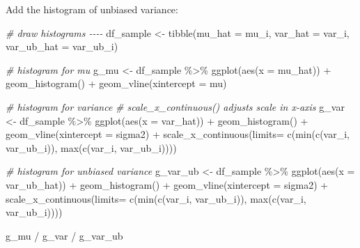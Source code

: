 \documentclass[
]{book}
\newenvironment{Shaded}{\begin{snugshade}}{\end{snugshade}}
\newcommand{\AttributeTok}[1]{\textcolor[rgb]{0.77,0.63,0.00}{#1}}
\newcommand{\CommentTok}[1]{\textcolor[rgb]{0.56,0.35,0.01}{\textit{#1}}}
\newcommand{\FunctionTok}[1]{\textcolor[rgb]{0.00,0.00,0.00}{#1}}
\newcommand{\NormalTok}[1]{#1}
\newcommand{\OtherTok}[1]{\textcolor[rgb]{0.56,0.35,0.01}{#1}}
\newcommand{\SpecialCharTok}[1]{\textcolor[rgb]{0.00,0.00,0.00}{#1}}
\begin{document}
Add the histogram of unbiased variance:

\begin{Shaded}
\begin{Highlighting}[]
\CommentTok{\# draw histograms {-}{-}{-}{-}}
\NormalTok{df\_sample }\OtherTok{\textless{}{-}} \FunctionTok{tibble}\NormalTok{(}\AttributeTok{mu\_hat =}\NormalTok{ mu\_i,}
                    \AttributeTok{var\_hat =}\NormalTok{ var\_i,}
                    \AttributeTok{var\_ub\_hat =}\NormalTok{ var\_ub\_i)}

\CommentTok{\# histogram for mu}
\NormalTok{g\_mu }\OtherTok{\textless{}{-}}\NormalTok{ df\_sample }\SpecialCharTok{\%\textgreater{}\%} 
  \FunctionTok{ggplot}\NormalTok{(}\FunctionTok{aes}\NormalTok{(}\AttributeTok{x =}\NormalTok{ mu\_hat)) }\SpecialCharTok{+}
  \FunctionTok{geom\_histogram}\NormalTok{() }\SpecialCharTok{+}
  \FunctionTok{geom\_vline}\NormalTok{(}\AttributeTok{xintercept =}\NormalTok{ mu)}

\CommentTok{\# histogram for variance}
\CommentTok{\# scale\_x\_continuous() adjusts scale in x{-}axis}
\NormalTok{g\_var }\OtherTok{\textless{}{-}}\NormalTok{ df\_sample }\SpecialCharTok{\%\textgreater{}\%} 
  \FunctionTok{ggplot}\NormalTok{(}\FunctionTok{aes}\NormalTok{(}\AttributeTok{x =}\NormalTok{ var\_hat)) }\SpecialCharTok{+}
  \FunctionTok{geom\_histogram}\NormalTok{() }\SpecialCharTok{+}
  \FunctionTok{geom\_vline}\NormalTok{(}\AttributeTok{xintercept =}\NormalTok{ sigma2) }\SpecialCharTok{+}
  \FunctionTok{scale\_x\_continuous}\NormalTok{(}\AttributeTok{limits=} \FunctionTok{c}\NormalTok{(}\FunctionTok{min}\NormalTok{(}\FunctionTok{c}\NormalTok{(var\_i, var\_ub\_i)),}
                               \FunctionTok{max}\NormalTok{(}\FunctionTok{c}\NormalTok{(var\_i, var\_ub\_i))))}

\CommentTok{\# histogram for unbiased variance}
\NormalTok{g\_var\_ub }\OtherTok{\textless{}{-}}\NormalTok{ df\_sample }\SpecialCharTok{\%\textgreater{}\%} 
  \FunctionTok{ggplot}\NormalTok{(}\FunctionTok{aes}\NormalTok{(}\AttributeTok{x =}\NormalTok{ var\_ub\_hat)) }\SpecialCharTok{+}
  \FunctionTok{geom\_histogram}\NormalTok{() }\SpecialCharTok{+}
  \FunctionTok{geom\_vline}\NormalTok{(}\AttributeTok{xintercept =}\NormalTok{ sigma2) }\SpecialCharTok{+}
  \FunctionTok{scale\_x\_continuous}\NormalTok{(}\AttributeTok{limits=} \FunctionTok{c}\NormalTok{(}\FunctionTok{min}\NormalTok{(}\FunctionTok{c}\NormalTok{(var\_i, var\_ub\_i)),}
                               \FunctionTok{max}\NormalTok{(}\FunctionTok{c}\NormalTok{(var\_i, var\_ub\_i))))}

\NormalTok{g\_mu }\SpecialCharTok{/}\NormalTok{ g\_var }\SpecialCharTok{/}\NormalTok{ g\_var\_ub}
\end{Highlighting}
\end{Shaded}
\end{document}
